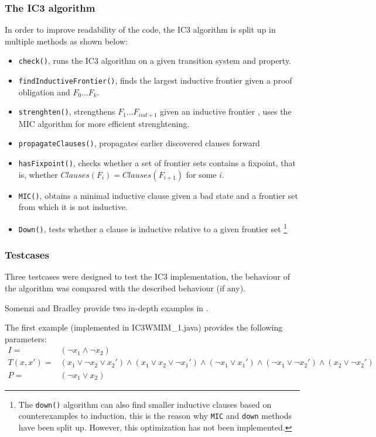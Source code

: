\documentclass[a4paper]{article}
\begin{document}
\subsubsection{The IC3 algorithm}
In order to improve readability of the code, the IC3 algorithm is split up in multiple methods as shown below:

\begin{itemize}
\item \texttt{check()}, runs the IC3 algorithm on a given transition system and property.
\item \texttt{findInductiveFrontier()}, finds the largest inductive frontier given a proof obligation and $F_0 \ldots F_k$.
\item \texttt{strenghten()}, strengthens $F_1 \ldots F_{ind+1}$ given an inductive frontier	, uses the MIC algorithm for more efficient strenghtening.
\item \texttt{propagateClauses()}, propagates earlier discovered clauses forward
\item \texttt{hasFixpoint()}, checks whether a set of frontier sets contains a fixpoint, that is, whether $Clauses(F_i) = Clauses(F_{i+1})$ for some $i$.
\item \texttt{MIC()}, obtains a minimal inductive clause given a bad state and a frontier set from which it is not inductive.
\item \texttt{Down()}, tests whether a clause is inductive relative to a given frontier set \footnote{The \texttt{down()} algorithm can also find smaller inductive clauses based on counterexamples to induction, this is the reason why \texttt{MIC} and \texttt{down} methods have been split up. However, this optimization has not been implemented.}
\end{itemize}

\subsubsection{Testcases}
\label{sec:ic3_testcases}
Three testcases were designed to test the IC3 implementation, the behaviour of the algorithm was compared with the described behaviour (if any).

Somenzi and Bradley provide two in-depth examples in \cite{Somenzi2011}.

The first example (implemented in IC3WMIM\_1.java) provides the following parameters:
\begin{align*}
I =& (\lnot x_1 \land \lnot x_2)\\
T(x,x') =& (x_1 \lor \lnot x_2 \lor x_2') \land (x_1 \lor x_2 \lor \lnot x_1') \land (\lnot x_1 \lor x_1') \land (\lnot x_1 \lor \lnot x_2') \land (x_2 \lor \lnot x_2') \\
P =& (\lnot x_1 \lor x_2)
\end{align*}
\end{document}

